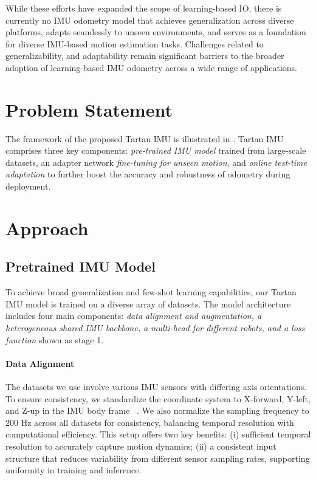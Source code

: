While these efforts have expanded the scope of learning-based IO, there is currently no IMU odometry model that achieves generalization across diverse platforms, adapts seamlessly to unseen environments, and serves as a foundation for diverse IMU-based motion estimation tasks.  Challenges related to generalizability, and adaptability remain significant barriers to the broader adoption of learning-based IMU odometry across a wide range of applications.  


\section{Problem Statement}
\label{chapter7:problem_statement}
The framework of the proposed Tartan IMU is illustrated in . Tartan IMU comprises three key components: \textit{pre-trained IMU model} trained from large-scale datasets, an adapter network \textit{fine-tuning for unseen motion}, and \textit{online test-time adaptation} to further boost the accuracy and robustness of odometry during deployment. 
\section{Approach}
\label{chapter7:proposed_approach}
\subsection{Pretrained IMU Model}
\label{sec:pretrained_model}





To achieve broad generalization and few-shot learning capabilities, our Tartan IMU model is trained on a diverse array of datasets. The model architecture includes four main components: \textit{data alignment and augmentation, a heterogeneous shared IMU backbone, a multi-head for different robots, and a loss function} shown as  stage 1.


\paragraph{Data Alignment}
The datasets we use involve various IMU sensors with differing axis orientations. To ensure consistency, we standardize the coordinate system to X-forward, Y-left, and Z-up in the IMU body frame ~\cite{airio}. 
We also normalize the sampling frequency to 200 Hz across all datasets for consistency, balancing temporal resolution with computational efficiency. This setup offers two key benefits: (i) sufficient temporal resolution to accurately capture motion dynamics; (ii) a consistent input structure that reduces variability from different sensor sampling rates, supporting uniformity in training and inference.

